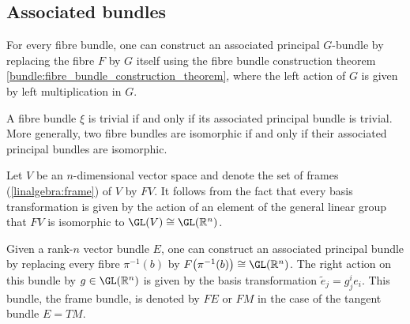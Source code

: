 
\subsection{Associated bundles}

    \begin{construct}\label{bundle:associated_bundle_construction}
        For every fibre bundle, one can construct an associated principal $G$-bundle by replacing the fibre $F$ by $G$ itself using the fibre bundle construction theorem \ref{bundle:fibre_bundle_construction_theorem}, where the left action of $G$ is given by left multiplication in $G$.
    \end{construct}

    \begin{property}[Triviality]
        A fibre bundle $\xi$ is trivial if and only if its associated principal bundle is trivial. More generally, two fibre bundles are isomorphic if and only if their associated principal bundles are isomorphic.
    \end{property}

    \begin{example}\label{bundle:frame_bundle}
        Let $V$ be an $n$-dimensional vector space and denote the set of frames (\cref{linalgebra:frame}) of $V$ by $FV$. It follows from the fact that every basis transformation is given by the action of an element of the general linear group that $FV$ is isomorphic to $\GL(V)\cong\GL(\mathbb{R}^n)$.

        Given a rank-$n$ vector bundle $E$, one can construct an associated principal bundle by replacing every fibre $\pi^{-1}(b)$ by $F\bigl(\pi^{-1}(b)\bigr)\cong\GL(\mathbb{R}^n)$. The right action on this bundle by $g\in\GL(\mathbb{R}^n)$ is given by the basis transformation $\widetilde{e}_j=g^i_je_i$. This bundle, the frame bundle, is denoted by $FE$ or $FM$ in the case of the tangent bundle $E=TM$.
    \end{example}

